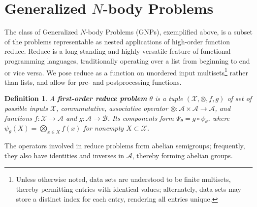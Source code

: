 \documentclass{article}
\newtheorem{definition} {Definition}
\newcommand{\killspace}{\vspace{-0.1in}}
\newcommand{\comp}{\mathbin{\circ}}
\begin{document}
%  
%  
%  
%  

\section{Generalized $N$-body Problems}

The class of Generalized $N$-body Problems (GNPs), exemplified above,
is a subset of the problems representable as nested applications of high-order function
reduce.  Reduce is a long-standing and highly versatile feature of
functional programming languages, traditionally operating over a list
from beginning to end or vice versa.  We pose reduce as a function on
unordered input multisets\footnote{Unless otherwise noted, data sets
are understood to be finite multisets, thereby permitting entries with
identical values; alternately, data sets may store a distinct index
for each entry, rendering all entries unique.} rather than lists, and
allow for pre- and postprocessing functions.
\begin{definition}
  A {\bf first-order reduce problem} $\theta$ is a tuple
  $(\mathcal{X},\otimes,f,g)$ of set of possible inputs $\mathcal{X}$,
  commmutative, associative operator $\otimes \colon \mathcal{A}
  \times \mathcal{A} \to \mathcal{A}$, and functions $f \colon
  \mathcal{X} \to \mathcal{A}$ and $g \colon \mathcal{A} \to
  \mathcal{B}$.  Its components form $\Psi_{\theta} = g \comp
  \psi_{\theta}$, where $\psi_{\theta}(X) = \bigotimes_{x \in X} f(x)$
  for nonempty $X \subset \mathcal{X}$.
\end{definition}
\killspace
\noindent The operators involved in reduce problems form abelian
semigroups; frequently, they also have identities and inverses in
$\mathcal{A}$, thereby forming abelian groups.
\end{document}
